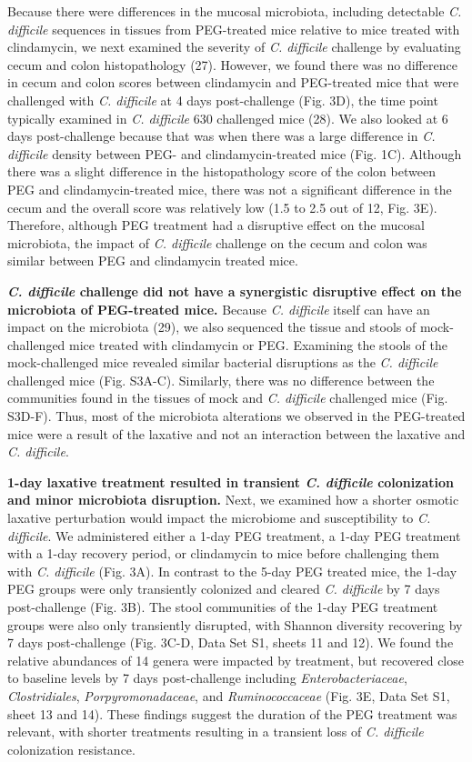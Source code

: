 \documentclass[
  11pt,
]{article}
\begin{document}
Because there were differences in the mucosal microbiota, including
detectable \emph{C. difficile} sequences in tissues from PEG-treated
mice relative to mice treated with clindamycin, we next examined the
severity of \emph{C. difficile} challenge by evaluating cecum and colon
histopathology (27). However, we found there was no difference in cecum
and colon scores between clindamycin and PEG-treated mice that were
challenged with \emph{C. difficile} at 4 days post-challenge (Fig. 3D),
the time point typically examined in \emph{C. difficile} 630 challenged
mice (28). We also looked at 6 days post-challenge because that was when
there was a large difference in \emph{C. difficile} density between PEG-
and clindamycin-treated mice (Fig. 1C). Although there was a slight
difference in the histopathology score of the colon between PEG and
clindamycin-treated mice, there was not a significant difference in the
cecum and the overall score was relatively low (1.5 to 2.5 out of 12,
Fig. 3E). Therefore, although PEG treatment had a disruptive effect on
the mucosal microbiota, the impact of \emph{C. difficile} challenge on
the cecum and colon was similar between PEG and clindamycin treated
mice.

\textbf{\emph{C. difficile} challenge did not have a synergistic
disruptive effect on the microbiota of PEG-treated mice.} Because
\emph{C. difficile} itself can have an impact on the microbiota (29), we
also sequenced the tissue and stools of mock-challenged mice treated
with clindamycin or PEG. Examining the stools of the mock-challenged
mice revealed similar bacterial disruptions as the \emph{C. difficile}
challenged mice (Fig. S3A-C). Similarly, there was no difference between
the communities found in the tissues of mock and \emph{C. difficile}
challenged mice (Fig. S3D-F). Thus, most of the microbiota alterations
we observed in the PEG-treated mice were a result of the laxative and
not an interaction between the laxative and \emph{C. difficile}.

\textbf{1-day laxative treatment resulted in transient \emph{C.
difficile} colonization and minor microbiota disruption.} Next, we
examined how a shorter osmotic laxative perturbation would impact the
microbiome and susceptibility to \emph{C. difficile}. We administered
either a 1-day PEG treatment, a 1-day PEG treatment with a 1-day
recovery period, or clindamycin to mice before challenging them with
\emph{C. difficile} (Fig. 3A). In contrast to the 5-day PEG treated
mice, the 1-day PEG groups were only transiently colonized and cleared
\emph{C. difficile} by 7 days post-challenge (Fig. 3B). The stool
communities of the 1-day PEG treatment groups were also only transiently
disrupted, with Shannon diversity recovering by 7 days post-challenge
(Fig. 3C-D, Data Set S1, sheets 11 and 12). We found the relative
abundances of 14 genera were impacted by treatment, but recovered close
to baseline levels by 7 days post-challenge including
\emph{Enterobacteriaceae}, \emph{Clostridiales},
\emph{Porpyromonadaceae}, and \emph{Ruminococcaceae} (Fig. 3E, Data Set
S1, sheet 13 and 14). These findings suggest the duration of the PEG
treatment was relevant, with shorter treatments resulting in a transient
loss of \emph{C. difficile} colonization resistance.
\end{document}
